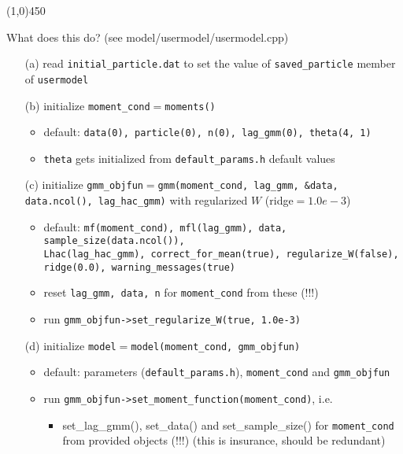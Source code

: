 \documentclass[11pt, letterpaper, notitlepage]{article}
\begin{document}
\begin{enumerate}
\begin{center}
\line(1,0){450}
\end{center}

What does this do? (see model/usermodel/usermodel.cpp)
\begin{enumerate}
\item[(a)] read \texttt{initial\_particle.dat} to set the value of \texttt{saved\_particle} member of \texttt{usermodel}
\item[(b)] initialize \texttt{moment\_cond}$=$\texttt{moments()}
          \begin{itemize}
          \item default: \texttt{data(0), particle(0), n(0), lag\_gmm(0), theta(4, 1)}
          \item \texttt{theta} gets initialized from \texttt{default\_params.h} default values
		  \end{itemize}
\item[(c)] initialize \texttt{gmm\_objfun}$=$\texttt{gmm(moment\_cond, lag\_gmm, \&data, data.ncol(), lag\_hac\_gmm)} with regularized $W$ (ridge$=1.0e-3$)
          \begin{itemize}
          \item default: \texttt{mf(moment\_cond), mfl(lag\_gmm), data, sample\_size(data.ncol()), \\ Lhac(lag\_hac\_gmm), correct\_for\_mean(true), regularize\_W(false), ridge(0.0), warning\_messages(true)}          
          \item reset \texttt{lag\_gmm, data, n} for \texttt{moment\_cond} from these (!!!)
          \item run \texttt{gmm\_objfun->set\_regularize\_W(true, 1.0e-3)}
		  \end{itemize}
\item[(d)] initialize \texttt{model}$=$\texttt{model(moment\_cond, gmm\_objfun)}
          \begin{itemize}
          \item default: parameters (\texttt{default\_params.h}), \texttt{moment\_cond} and \texttt{gmm\_objfun}		          
          \item run \texttt{gmm\_objfun->set\_moment\_function(moment\_cond)}, i.e. 
          \begin{itemize}
          \item set\_lag\_gmm(), set\_data() and set\_sample\_size() for \texttt{moment\_cond} from provided objects (!!!) (this is insurance, should be redundant)
          \end{itemize}
              

\end{itemize}
\end{enumerate}
\end{enumerate}
\end{document}
